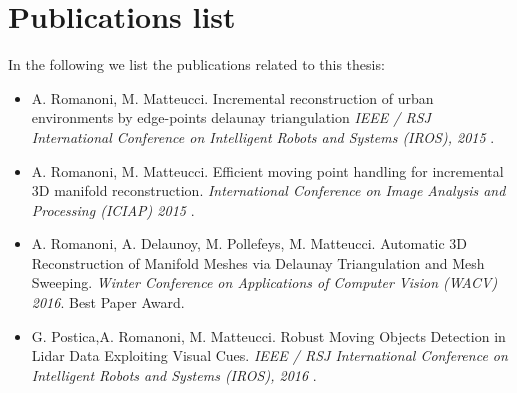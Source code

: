 \section{Publications list}
In the following we list the publications related to this thesis:
\begin{itemize}
 \item  A. Romanoni, M. Matteucci. Incremental reconstruction of urban environments by edge-points delaunay triangulation  \emph{IEEE / RSJ International Conference on Intelligent Robots and Systems (IROS), 2015} \cite{romanoni15b}.
 \item A. Romanoni, M. Matteucci. Efficient moving point handling for incremental 3D manifold reconstruction. \emph{International Conference on Image Analysis and Processing (ICIAP) 2015} \cite{romanoni15a}.
 \item A. Romanoni, A. Delaunoy, M. Pollefeys, M. Matteucci. Automatic 3D Reconstruction of Manifold Meshes via Delaunay Triangulation and Mesh Sweeping. \emph{Winter Conference on Applications of Computer Vision (WACV) 2016}. Best Paper Award. \cite{romanoni16}
 \item G. Postica,A. Romanoni, M. Matteucci. Robust Moving Objects Detection in Lidar Data Exploiting Visual Cues. \emph{IEEE / RSJ International Conference on Intelligent Robots and Systems (IROS), 2016}  \cite{postica16}.
\end{itemize}










